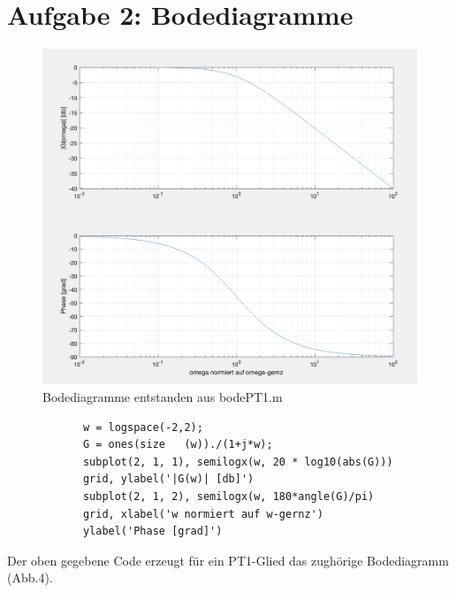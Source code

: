 \documentclass{article}
\begin{document}
	\section{Aufgabe 2: Bodediagramme}
		\begin{figure}[h]
 		 	\includegraphics[scale=0.3, center]{./Bodediagramme.png}
			\caption{Bodediagramme entstanden aus bodePT1.m}
			\label{fig1: Bodediagramm1}
		\end{figure}
		\begin{lstlisting}
			w = logspace(-2,2);
			G = ones(size	(w))./(1+j*w);
			subplot(2, 1, 1), semilogx(w, 20 * log10(abs(G)))
			grid, ylabel('|G(w)| [db]')
			subplot(2, 1, 2), semilogx(w, 180*angle(G)/pi)
			grid, xlabel('w normiert auf w-gernz')
			ylabel('Phase [grad]')
		\end{lstlisting}
		Der oben gegebene Code erzeugt für ein PT1-Glied das zughörige Bodediagramm (Abb.4).
\end{document}
